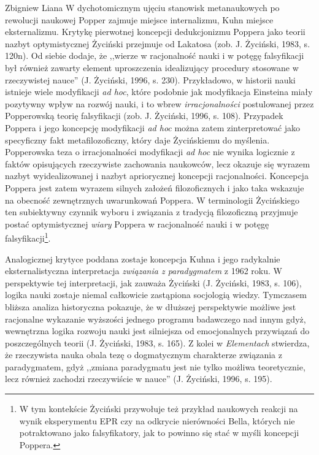\begin{artplenv}{Zbigniew Liana}
W dychotomicznym ujęciu stanowisk metanaukowych po rewolucji naukowej Popper zajmuje miejsce internalizmu, Kuhn miejsce
eksternalizmu. Krytykę pierwotnej koncepcji dedukcjonizmu Poppera jako teorii nazbyt optymistycznej Życiński przejmuje
od Lakatosa \label{ref:RNDCRLw5MmQwf}(zob. J. Życiński, 1983, s. 120n). Od siebie dodaje, że  ,,wierze w racjonalność
nauki i w potęgę falsyfikacji był również zawarty element uproszczenia idealizujący procedury stosowane w rzeczywistej
nauce'' \label{ref:RNDR9nCa1gaG1}(J. Życiński, 1996, s. 230).  Przykładowo, w historii nauki istnieje wiele modyfikacji
\textit{ad hoc}, które podobnie jak modyfikacja Einsteina miały pozytywny wpływ na rozwój nauki, i to wbrew
\textit{irracjonalności} postulowanej przez Popperowską teorię falsyfikacji \label{ref:RNDq9oApJerP4}(zob. J. Życiński,
1996, s. 108). Przypadek Poppera i jego koncepcję modyfikacji \textit{ad hoc} można zatem zinterpretować jako specyficzny
fakt metafilozoficzny, który daje Życińskiemu do myślenia. Popperowska teza o irracjonalności modyfikacji \textit{ad hoc}
nie wynika logicznie z faktów opisujących rzeczywiste zachowania naukowców, lecz okazuje się wyrazem nazbyt
wyidealizowanej i nazbyt apriorycznej koncepcji racjonalności. Koncepcja Poppera jest zatem wyrazem silnych założeń
filozoficznych i jako taka wskazuje na obecność zewnętrznych uwarunkowań Poppera. W terminologii Życińskiego ten
subiektywny czynnik wyboru i związania z tradycją filozoficzną przyjmuje postać optymistycznej \textit{wiary} Poppera w
racjonalność nauki i w potęgę falsyfikacji\footnote{W tym kontekście Życiński przywołuje też przykład naukowych reakcji
	na wynik eksperymentu EPR czy na  odkrycie nierówności Bella, których nie potraktowano jako falsyfikatory, jak to
	powinno się stać w myśli koncepcji Poppera.}.

Analogicznej krytyce poddana zostaje koncepcja Kuhna i jego radykalnie eksternalistyczna interpretacja \textit{związania z
	paradygmatem} z 1962 roku. W perspektywie tej interpretacji, jak zauważa Życiński \label{ref:RNDaETzNFGzG9}(J.
Życiński, 1983, s. 106), logika nauki zostaje niemal całkowicie zastąpiona socjologią wiedzy. Tymczasem bliższa analiza
historyczna pokazuje, że w dłuższej perspektywie możliwe jest racjonalne wykazanie wyższości jednego programu
badawczego nad innym gdyż, wewnętrzna logika rozwoju nauki jest silniejsza od emocjonalnych przywiązań do
poszczególnych teorii \label{ref:RND184R61G3Ny}(J. Życiński, 1983, s. 165). Z kolei w \textit{Elementach} stwierdza, że
rzeczywista nauka obala tezę o dogmatycznym charakterze związania z paradygmatem, gdyż ,,zmiana paradygmatu jest nie
tylko możliwa teoretycznie, lecz również zachodzi rzeczywiście w nauce'' \label{ref:RND8iXlMhyTs3}(J. Życiński, 1996, s.
195).


\end{artplenv}
